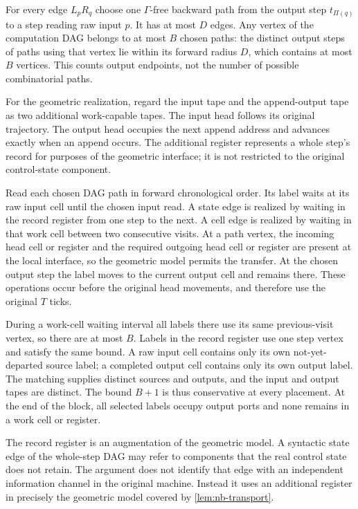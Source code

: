 \begin{informalproof}
For every edge $L_pR_q$ choose one $\Gamma$-free backward path from
the output step $t_{\Pi(q)}$ to a step reading raw input $p$.  It has
at most $D$ edges.  Any vertex of the computation DAG belongs to at
most $B$ chosen paths: the distinct output steps of paths using that
vertex lie within its forward radius $D$, which contains at most $B$
vertices.  This counts output endpoints, not the number of possible
combinatorial paths.

For the geometric realization, regard the input tape and the
append-output tape as two additional work-capable tapes.  The input
head follows its original trajectory.  The output head occupies the
next append address and advances exactly when an append occurs.
The additional register represents a whole step's record for purposes
of the geometric interface; it is not restricted to the original
control-state component.

Read each chosen DAG path in forward chronological order.  Its label
waits at its raw input cell until the chosen input read.  A state edge
is realized by waiting in the record register from one step to the
next.  A cell edge is realized by waiting in that work cell between
two consecutive visits.  At a path vertex, the incoming head cell or
register and the required outgoing head cell or register are present
at the local interface, so the geometric model permits the transfer.
At the chosen output step the label moves to the current output cell
and remains there.  These operations occur before the original head
movements, and therefore use the original $T$ ticks.

During a work-cell waiting interval all labels there use its same
previous-visit vertex, so there are at most $B$.  Labels in the record
register use one step vertex and satisfy the same bound.  A raw input
cell contains only its own not-yet-departed source label; a completed
output cell contains only its own output label.  The matching supplies
distinct sources and outputs, and the input and output tapes are
distinct.  The bound $B+1$ is thus conservative at every placement.
At the end of the block, all selected labels occupy output ports and
none remains in a work cell or register.

The record register is an augmentation of the geometric model.  A
syntactic state edge of the whole-step DAG may refer to components that
the real control state does not retain.  The argument does not identify
that edge with an independent information channel in the original
machine.  Instead it uses an additional register in precisely the
geometric model covered by \cref{lem:nb-transport}.


\end{informalproof}
